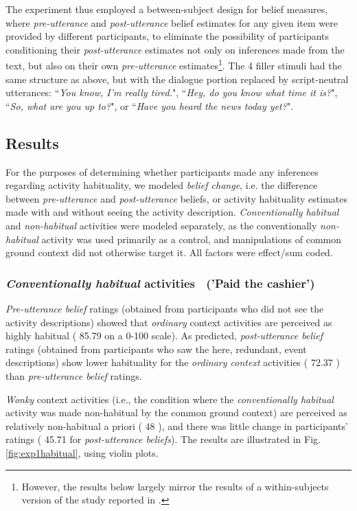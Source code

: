 \documentclass{sp}\usepackage[]{graphicx}\usepackage[]{color}
\begin{document}
The experiment thus employed a between-subject design for belief measures, where \textit{pre-utterance} and \textit{post-utterance} belief estimates for any given item were provided by different participants, to eliminate the possibility of participants conditioning their \textit{post-utterance} estimates not only on inferences made from the text, but also on their own \textit{pre-utterance} estimates\footnote{However, the results below largely mirror the results of a within-subjects version of the study reported in \citet{Kravtchenko2015}.}. The 4 filler stimuli had the same structure as above, but with the dialogue portion replaced by script-neutral utterances: ``\textit{You know, I'm really tired.}", ``\textit{Hey, do you know what time it is?}", ``\textit{So, what are you up to?}", or ``\textit{Have you heard the news today yet?}".

\subsection{Results}

For the purposes of determining whether participants made any inferences regarding activity habituality, we modeled \textit{belief change}, i.e. the difference between \textit{pre-utterance} and \textit{post-utterance} beliefs, or activity habituality estimates made with and without seeing the activity description. \textit{Conventionally habitual} and \textit{non-habitual} activities were modeled separately, as the conventionally \textit{non-habitual} activity was used primarily as a control, and manipulations of common ground context did not otherwise target it. All factors were effect/sum coded. 

\subsubsection{\textit{Conventionally habitual} activities$\quad$('Paid the cashier')}

\textit{Pre-utterance belief} ratings (obtained from participants who did not see the activity descriptions) showed that \textit{ordinary} context activities are perceived as highly habitual (%
85.79
 on a 0-100 scale). As predicted, \textit{post-utterance belief} ratings (obtained from participants who saw the here, redundant, event descriptions) show lower habituality for the \textit{ordinary context} activities (%
72.37
) than \textit{pre-utterance belief} ratings.

\textit{Wonky} context activities (i.e., the condition where the \textit{conventionally habitual} activity was made non-habitual by the common ground context) are perceived as relatively non-habitual a priori (%
48
), and there was little change in participants' ratings (%
45.71
 for \textit{post-utterance beliefs}).  The results are illustrated in Fig. \ref{fig:exp1habitual}, using violin plots.
\end{document}
